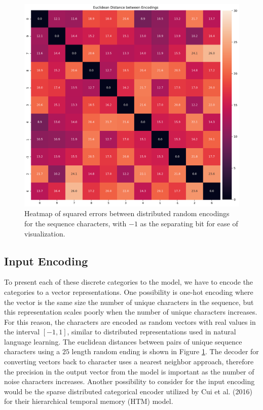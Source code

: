 \documentclass{article}
\begin{document}
\begin{figure}[!h]
    \centering
    \includegraphics[width=\linewidth]{../notebooks/matrix-distances.png}
    \caption{Heatmap of squared errors between distributed random encodings for the sequence characters, with $-1$ as the separating bit for ease of visualization.}
    \label{fig:encoding-distance}
\end{figure}

\subsection*{Input Encoding}

To present each of these discrete categories to the model, we have to encode the categories to a vector representations. One possibility is one-hot encoding where the vector is the same size the number of unique characters in the sequence, but this representation scales poorly when the number of unique characters increases. For this reason, the characters are encoded as random vectors with real values in the interval $\left[-1, 1\right]$, similar to distributed representations used in natural language learning. \cite{mikolov2013distributed} The euclidean distances between pairs of unique sequence characters using a $25$ length random ending is shown in Figure \ref{fig:encoding-distance}. The decoder for converting vectors back to character uses a nearest neighbor approach, therefore the precision in the output vector from the model is important as the number of noise characters increases. Another possibility to consider for the input encoding would be the sparse distributed categorical encoder utilized by Cui et al. (2016) for their hierarchical temporal memory (HTM) model.
\end{document}
